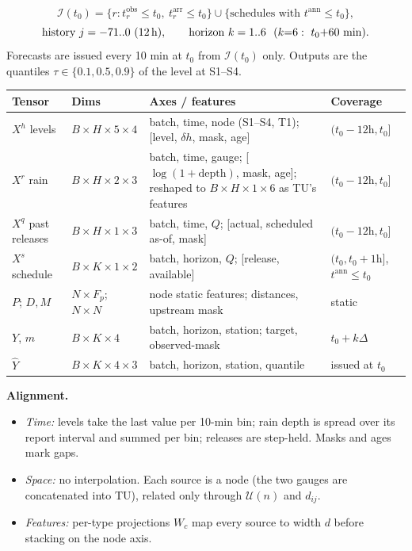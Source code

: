 \documentclass[11pt, a4paper]{article}
\begin{document}
\[
\mathcal I(t_0)=\{r: t^{\mathrm{obs}}_r\le t_0,\ t^{\mathrm{arr}}_r\le t_0\}\cup\{\text{schedules with } t^{\mathrm{ann}}\le t_0\},
\]
\[
\text{history } j=-71..0\ (12\text{\,h}),\qquad \text{horizon } k=1..6\ \ (k{=}6:\ t_0{+}60\text{ min}).
\]
Forecasts are issued every 10 min at $t_0$ from $\mathcal I(t_0)$ only. Outputs are the quantiles $\tau\in\{0.1,0.5,0.9\}$ of the level at S1--S4.

\begin{center}\small
\begin{tabularx}{\textwidth}{@{}l l X l@{}}
\toprule
Tensor & Dims & Axes / features & Coverage\\
\midrule
$X^h$ levels & $B{\times}H{\times}5{\times}4$ & batch, time, node (S1--S4, T1); [level, $\delta h$, mask, age] & $(t_0{-}12\text{h},t_0]$\\
$X^r$ rain & $B{\times}H{\times}2{\times}3$ & batch, time, gauge; [$\log(1{+}\text{depth})$, mask, age]; reshaped to $B{\times}H{\times}1{\times}6$ as TU's features & $(t_0{-}12\text{h},t_0]$\\
$X^q$ past releases & $B{\times}H{\times}1{\times}3$ & batch, time, $Q$; [actual, scheduled as-of, mask] & $(t_0{-}12\text{h},t_0]$\\
$X^s$ schedule & $B{\times}K{\times}1{\times}2$ & batch, horizon, $Q$; [release, available] & $(t_0,t_0{+}1\text{h}]$, $t^{\mathrm{ann}}{\le}t_0$\\
$P$; $D,M$ & $N{\times}F_p$; $N{\times}N$ & node static features; distances, upstream mask & static\\
$Y$, $m$ & $B{\times}K{\times}4$ & batch, horizon, station; target, observed-mask & $t_0{+}k\Delta$\\
$\hat Y$ & $B{\times}K{\times}4{\times}3$ & batch, horizon, station, quantile & issued at $t_0$\\
\bottomrule
\end{tabularx}
\end{center}

\textbf{Alignment.}
\begin{itemize}[leftmargin=*, itemsep=0pt]
  \item \emph{Time:} levels take the last value per 10-min bin; rain depth is spread over its report interval and summed per bin; releases are step-held. Masks and ages mark gaps.
  \item \emph{Space:} no interpolation. Each source is a node (the two gauges are concatenated into TU), related only through $\mathcal U(n)$ and $d_{ij}$.
  \item \emph{Features:} per-type projections $W_c$ map every source to width $d$ before stacking on the node axis.
\end{itemize}
\end{document}
